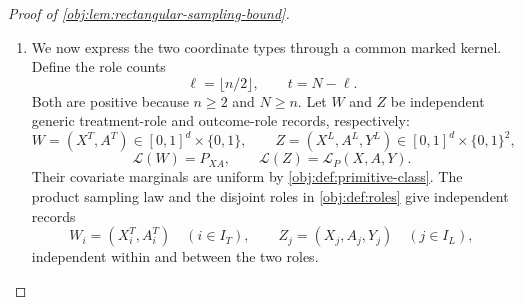 \documentclass[11pt]{article}
\begin{document}
\begin{proof}[Proof of \cref{obj:lem:rectangular-sampling-bound}]
\begin{enumerate}
For completeness, the same factors give an explicit row-integral bound for the fine kernel. Set
\[
\delta=\frac hJ,\qquad
\mathcal Z_J=\{0,\ldots,J-1\}^d,\qquad
x_{\mathrm{cell},\mathbf z,i}
=\frac12-\frac h2+\left(z_i+\frac12\right)\delta
\quad(\mathbf z\in\mathcal Z_J).
\]
Let \(C_{\mathrm{cell},\mathbf z}\) be the product of the intervals
\[
\left[\frac12-\frac h2+z_i\delta,\,
      \frac12-\frac h2+(z_i+1)\delta\right),
\]
with the right endpoint included when \(z_i=J-1\). Thus these cells partition \(C_h\).
The fine basis coordinates of \cref{obj:def:projection} are
\[
b_{\mathbf z,u}(x)
=\sqrt{J^d}\,\mathbf1_{C_{\mathrm{cell},\mathbf z}}(x)
 \prod_{i=1}^d
 p_{\mathrm{ref},u_i}
 \left(\frac{x_i-x_{\mathrm{cell},\mathbf z,i}}{\delta}\right),
\qquad
x\in\mathbb R^d,\quad
(\mathbf z,u)\in\mathcal Z_J\times\mathcal U_d.
\]
In particular, their values are zero outside their supporting cells, and
\[
|b_{\mathbf z,u}(x)|\le\sqrt{J^d}\,4^d.
\]
With \(\boldsymbol0=(0,\ldots,0)\), the constant coordinate satisfies
\[
b_{\mathbf z,\boldsymbol0}(x)
=\sqrt{J^d}\,\mathbf1_{C_{\mathrm{cell},\mathbf z}}(x),
\qquad
\int b_{\mathbf z,\boldsymbol0}(x)^2\,d\nu_h(x)=1,
\]
where the last identity is its orthonormal normalization. Pointwise,
\[
|b_{\mathbf z,u}(x)|
\le \frac{4^d}{\sqrt{J^d}}\,
      b_{\mathbf z,\boldsymbol0}(x)^2,
\]
so integration yields
\[
\int |b_{\mathbf z,u}(x)|\,d\nu_h(x)
\le\frac{4^d}{\sqrt{J^d}}.
\]
If \(x\in C_{\mathrm{cell},\mathbf z}\), only that cell contributes to the kernel, and hence
\[
K_J(x,x')
=\sum_{u\in\mathcal U_d}
 b_{\mathbf z,u}(x)b_{\mathbf z,u}(x').
\]
It follows that
\[
\begin{aligned}
\int |K_J(x,x')|\,d\nu_h(x')
&\le\sum_{u\in\mathcal U_d}
 |b_{\mathbf z,u}(x)|
 \int |b_{\mathbf z,u}(x')|\,d\nu_h(x')\\
&\le q\bigl(\sqrt{J^d}\,4^d\bigr)
          \frac{4^d}{\sqrt{J^d}}
=D_d.
\end{aligned}
\]
If \(x\) belongs to no fine cell, every fine basis coordinate at \(x\) is zero, and the same bound holds. Thus
\[
\int |K_J(x,x')|\,d\nu_h(x')\le D_d
\qquad(x\in\mathbb R^d).
\]
The basis-product formula also gives
\[
K_J(x,x')=K_J(x',x).
\]

\item We now express the two coordinate types through a common marked kernel. Define the role counts
\[
\ell=\lfloor n/2\rfloor,\qquad t=N-\ell.
\]
Both are positive because \(n\ge2\) and \(N\ge n\). Let \(W\) and \(Z\) be independent generic treatment-role and outcome-role records, respectively:
\[
W=(X^T,A^T)\in[0,1]^d\times\{0,1\},
\qquad
Z=(X^L,A^L,Y^L)\in[0,1]^d\times\{0,1\}^2,
\]
\[
\mathcal L(W)=P_{XA},
\qquad
\mathcal L(Z)=\mathcal L_P(X,A,Y).
\]
Their covariate marginals are uniform by \cref{obj:def:primitive-class}. The product sampling law and the disjoint roles in \cref{obj:def:roles} give independent records
\[
W_i=(X_i^T,A_i^T)\quad(i\in I_T),
\qquad
Z_j=(X_j,A_j,Y_j)\quad(j\in I_L),
\]
independent within and between the two roles.


\end{enumerate}
\end{proof}
\end{document}

